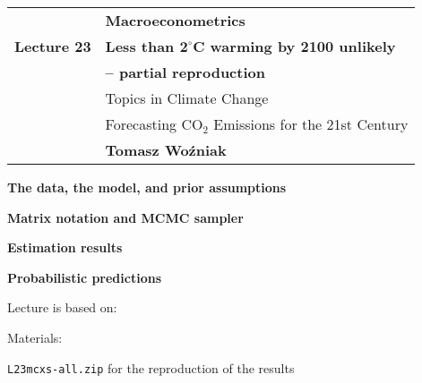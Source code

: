 \documentclass[notes,blackandwhite,mathsans,usenames,dvipsnames]{beamer}
\begin{document}






{
\begin{frame}

\vspace{1cm}
\begin{tabular}{rl}
&\textbf{\LARGE\color{yel} Macroeconometrics}\\[8ex]
\textbf{\large\color{yel} Lecture 23}&\textbf{\large\color{blu}Less than $\mathbf{2^{\circ}}$C warming by 2100 unlikely}\\
&\textbf{\large\color{blu}-- partial reproduction}\\[6ex]
&{\large\color{white} Topics in Climate Change}\\
&{\large\color{white} Forecasting CO$_2$ Emissions for the 21st Century}\\[7ex]
&\textbf{Tomasz Wo\'zniak}\\[2ex]
\end{tabular}

\end{frame}
}


{
\begin{frame}

\vspace{1cm}\textbf{\color{yel}The data, the model, and prior assumptions}

\bigskip\textbf{\color{blu}Matrix notation and MCMC sampler}

\bigskip\textbf{\color{blu}Estimation results}

\bigskip\textbf{\color{yel}Probabilistic predictions}



\vspace{2cm} Lecture is based on: \footnotesize


\normalsize\bigskip
Materials: \footnotesize

 \texttt{L23mcxs-all.zip} {\color{yel}for the reproduction of the results}

\end{frame}
}
\end{document}
